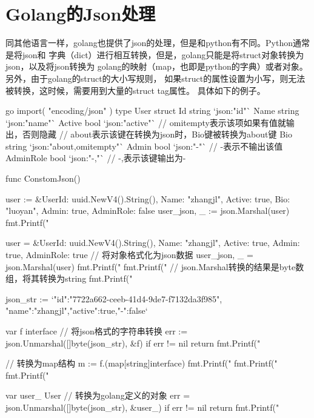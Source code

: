 \section{Golang的Json处理}
同其他语言一样，golang也提供了json的处理，但是和python有不同。Python通常是将json和
字典（dict）进行相互转换，但是，golang只能是将struct对象转换为json，以及将json转换为
golang的映射（map，也即是python的字典）或者对象。另外，由于golang的struct的大小写规则，
如果struct的属性设置为小写，则无法被转换，这时候，需要用到大量的struct tag属性。
具体如下的例子。
\begin{code-block}{go}
import(
    "encoding/json"
)
type User struct {
    Id     string `json:"id"`
    Name   string `json:"name"`
    Active bool   `json:"active"`
    // omitempty表示该项如果有值就输出，否则隐藏
    // about表示该键在转换为json时，Bio键被转换为about键
    Bio       string `json:"about,omitempty"`
    Admin     bool   `json:"-"`  // -表示不输出该值
    AdminRole bool   `json:"-,"` // -,表示该键输出为-
}

func ConstomJson() {
    user := &User{Id: uuid.NewV4().String(), Name: "zhangjl",
                  Active: true, Bio: "luoyan", Admin: true, AdminRole: false}
    user_json, _ := json.Marshal(user)
    fmt.Printf("%

    user = &User{Id: uuid.NewV4().String(), Name: "zhangjl",
                 Active: true, Admin: true, AdminRole: true}
    // 将对象格式化为json数据
    user_json, _ = json.Marshal(user)
    fmt.Printf("%
    fmt.Printf("%
    // json.Marshal转换的结果是byte数组，将其转换为string
    fmt.Printf("%

    json_str := `{"id":"7722a662-ceeb-41d4-9de7-f7132da3f985",
                  "name":"zhangjl","active":true,"-":false}`

    var f interface{}
    // 将json格式的字符串转换
    err := json.Unmarshal([]byte(json_str), &f)
    if err != nil {
        return
    }
    fmt.Printf("%

    // 转换为map结构
    m := f.(map[string]interface{})
    fmt.Printf("%
    fmt.Printf("%
    fmt.Printf("%

    var user_ User
    // 转换为golang定义的对象
    err = json.Unmarshal([]byte(json_str), &user_)
    if err != nil {
        return
    }
    fmt.Printf("%
}
\end{code-block}

